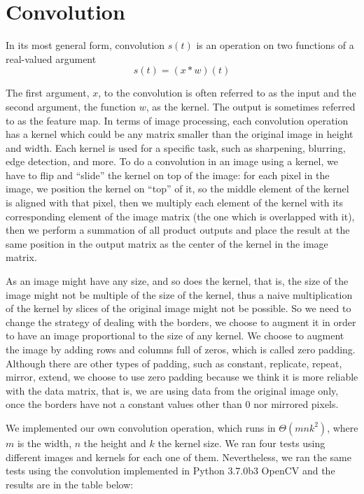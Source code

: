 \documentclass[]{IEEEtran}
\begin{document}
  \section{Convolution}
  In its most general form, convolution $s(t)$ is an operation on two functions of a real-valued argument\cite{b1}
  $$
  s(t) = (x \ast w)(t)
  $$
  
  The first argument, $x$, to the convolution is often referred to as the input and the second argument, the function $w$, as the kernel. The output is sometimes referred to as the feature map.
  In terms of image processing, each convolution operation has a kernel which could be any matrix smaller than the original image in height and width. Each kernel is used for a specific task, such as sharpening, blurring, edge detection, and more.
  To do a convolution in an image using a kernel, we have to flip and ``slide'' the kernel on top of the image: for each pixel in the image, we position the kernel on ``top'' of it, so the middle element of the kernel is aligned with that pixel, then we multiply each element of the kernel with its corresponding element of the image matrix (the one which is overlapped with it), then we perform a summation of all product outputs and place the result at the same position in the output matrix as the center of the kernel in the image matrix\cite{b2}. 
  
  As an image might have any size, and so does the kernel, that is, the size of the image might not be multiple of the size of the kernel, thus a naive multiplication of the kernel by slices of the original image might not be possible. So we need to change the strategy of dealing with the borders, we choose to augment it in order to have an image proportional to the size of any kernel. We choose to augment the image by adding rows and columns full of zeros, which is called zero padding. Although there are other types of padding, such as constant, replicate, repeat, mirror, extend\cite{b3}, we choose to use zero padding because we think it is more reliable with the data matrix, that is, we are using data from the original image only, once the borders have not a constant values other than $0$ nor mirrored pixels.
  
  We implemented our own convolution operation, which runs in $\Theta(mnk^2)$, where $m$ is the width, $n$ the height and $k$ the kernel size. We ran four tests using different images and kernels for each one of them. Nevertheless, we ran the same tests using the convolution implemented in Python 3.7.0b3 OpenCV and the results are in the table below:
      
\end{document}
